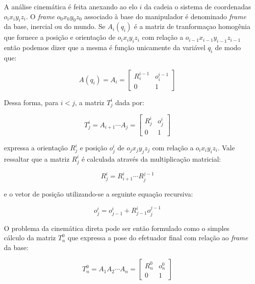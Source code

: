 A análise cinemática é feita anexando ao elo $i$ da cadeia o sistema de
coordenadas $o_i x_i y_i z_i$. O \emph{frame} $o_0 x_0 y_0 z_0$ associado à base do
manipulador é denominado \emph{frame} da base, inercial ou do mundo. Se
$A_i(q_i)$ é a matriz de tranformaçao homogênia que fornece a posição e
orientação de $o_i x_i y_i z_i$ com relação a $o_{i-1} x_{i-1} y_{i-1} z_{i-1}$ então
podemos dizer que a mesma é função unicamente da variável $q_i$ de modo que:

\begin{equation}
    A(q_i) = A_i = \begin{bmatrix}
        R^{i-1}_i & o^{i-1}_i \\
        0         & 1
    \end{bmatrix}
\end{equation}

Dessa forma, para $i < j$, a matriz $T_j^i$ dada por:

\begin{equation}
    T_j^i = A_{i+1} \cdots A_j = \begin{bmatrix}
        R^i_j & o^i_j \\
        0     & 1
    \end{bmatrix}
\end{equation}

expressa a orientação $R^i_j$ e posição $o^i_j$ de $o_j x_j y_j z_j$ com relação a
$o_i x_i y_i z_i$. Vale ressaltar que a matriz $R^i_j$ é calculada através da
multiplicação matricial:

\begin{equation}
    R^i_j = R^i_{i+1} \cdots R^{j-1}_j
\end{equation}

e o vetor de posição utilizando-se a seguinte equação recursiva:

\begin{equation}
    o^i_j = o^i_{j-1} + R^i_{j-1}o^{j-1}_j
\end{equation}

O problema da cinemática direta pode ser então formulado como o simples cálculo
da matriz $T^0_n$ que expressa a pose do efetuador final com relação ao
\emph{frame} da base:

\begin{equation}\label{eq:fkine}
    T^0_n = A_1 A_2 \cdots A_n = \begin{bmatrix}
        R^0_n & o^0_n \\
        0     & 1
    \end{bmatrix}
\end{equation}

